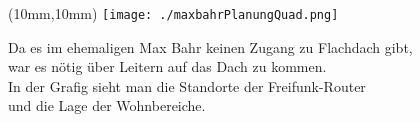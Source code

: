 \vspace{1.3cm}
\hspace{1.4cm}



\newpage
\begin{textblock*}{190mm}(10mm,10mm)
\texttt{[image: ./maxbahrPlanungQuad.png]}\\
\end{textblock*}

Da es im ehemaligen Max Bahr keinen Zugang zu Flachdach gibt,\\
war es nötig über Leitern auf das Dach zu kommen.\\
In der Grafig sieht man die Standorte der Freifunk-Router \\
und die Lage der Wohnbereiche.\\
 




